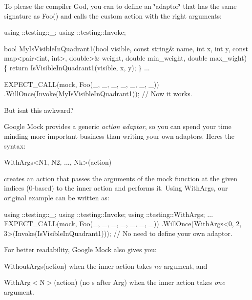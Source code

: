 To please the compiler God, you can to define an \char`\"{}adaptor\char`\"{} that has the same signature as {\ttfamily Foo()} and calls the custom action with the right arguments\+:


\begin{DoxyCode}
using ::testing::\_;
using ::testing::Invoke;

bool MyIsVisibleInQuadrant1(bool visible, const string& name, int x, int y,
                            const map<pair<int, int>, double>& weight,
                            double min\_weight, double max\_wight) \{
  return IsVisibleInQuadrant1(visible, x, y);
\}
...

  EXPECT\_CALL(mock, Foo(\_, \_, \_, \_, \_, \_, \_))
      .WillOnce(Invoke(MyIsVisibleInQuadrant1));  // Now it works.
\end{DoxyCode}


But isn\textquotesingle{}t this awkward?

Google Mock provides a generic {\itshape action adaptor}, so you can spend your time minding more important business than writing your own adaptors. Here\textquotesingle{}s the syntax\+:


\begin{DoxyCode}
WithArgs<N1, N2, ..., Nk>(action)
\end{DoxyCode}


creates an action that passes the arguments of the mock function at the given indices (0-\/based) to the inner {\ttfamily action} and performs it. Using {\ttfamily With\+Args}, our original example can be written as\+:


\begin{DoxyCode}
using ::testing::\_;
using ::testing::Invoke;
using ::testing::WithArgs;
...
  EXPECT\_CALL(mock, Foo(\_, \_, \_, \_, \_, \_, \_))
      .WillOnce(WithArgs<0, 2, 3>(Invoke(IsVisibleInQuadrant1)));
      // No need to define your own adaptor.
\end{DoxyCode}


For better readability, Google Mock also gives you\+:


\begin{DoxyItemize}
\item {\ttfamily Without\+Args(action)} when the inner {\ttfamily action} takes {\itshape no} argument, and
\item {\ttfamily With\+Arg$<$N$>$(action)} (no {\ttfamily s} after {\ttfamily Arg}) when the inner {\ttfamily action} takes {\itshape one} argument.
\end{DoxyItemize}

